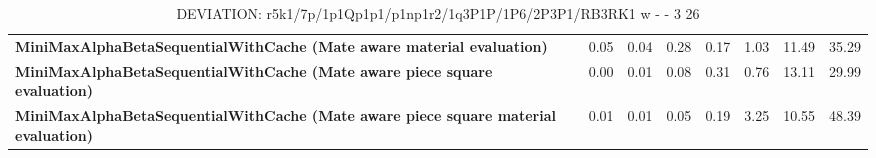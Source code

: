 \begin{table}[H]
{\begin{tabular}{|p{8cm}|*{7}{r|}}
            \rowcolor[HTML]{EFEFEF}
            \textbf{MiniMaxAlphaBetaSequentialWithCache (Mate aware material evaluation)}              & 0.05 & 0.04 & 0.28 & 0.17 & 1.03 & 11.49 & 35.29 \\
            \rowcolor[HTML]{FFFFFF}
            \textbf{MiniMaxAlphaBetaSequentialWithCache (Mate aware piece square evaluation)}               & 0.00 & 0.01 & 0.08 & 0.31 & 0.76 & 13.11 & 29.99 \\
            \rowcolor[HTML]{EFEFEF}
            \textbf{MiniMaxAlphaBetaSequentialWithCache (Mate aware piece square material evaluation)}               & 0.01 & 0.01 & 0.05 & 0.19 & 3.25 & 10.55 & 48.39 \\

            \hline
        \end{tabular}%
    }
    \caption{DEVIATION: r5k1/7p/1p1Qp1p1/p1np1r2/1q3P1P/1P6/2P3P1/RB3RK1 w - - 3 26}
    \label{tab:mid-game---discovery---short-deviation}
\end{table}
